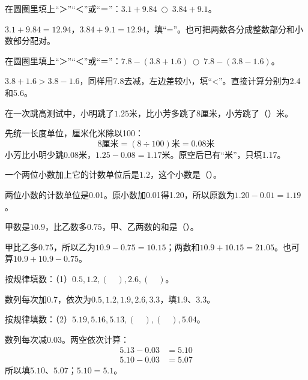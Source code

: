 在圆圈里填上“＞”“＜”或“＝”：\(3.1+9.84\ \bigcirc\ 3.84+9.1\)。\par
\begin{BookAnswer}
\(3.1+9.84=12.94\)，\allowbreak{}\(3.84+9.1=12.94\)，填“=”。也可把两数各分成整数部分和小数部分配对。
\end{BookAnswer}

在圆圈里填上“＞”“＜”或“＝”：\(7.8-(3.8+1.6)\ \bigcirc\ 7.8-(3.8-1.6)\)。\par
\begin{BookAnswer}
\(3.8+1.6>3.8-1.6\)，同样用7.8去减，左边差较小，填“<”。直接计算分别为2.4和5.6。
\end{BookAnswer}

在一次跳高测试中，小明跳了\(1.25\)米，比小芳多跳了8厘米，小芳跳了（\hspace{1.8em}）米。\par
\begin{BookAnswer}
先统一长度单位，厘米化米除以100：\[8\text{厘米}=(8\div100)\text{米}=0.08\text{米}\]小芳比小明少跳0.08米，\allowbreak{}\(1.25-0.08=1.17\)米。原空后已有“米”，只填1.17。
\end{BookAnswer}

一个两位小数加上它的计数单位后是\(1.2\)，这个小数是（\hspace{1.8em}）。\par
\begin{BookAnswer}
两位小数的计数单位是0.01。原小数加0.01得1.20，所以原数为\(1.20-0.01=1.19\)。
\end{BookAnswer}

甲数是\(10.9\)，比乙数多\(0.75\)，甲、乙两数的和是（\hspace{1.8em}）。\par
\begin{BookAnswer}
甲比乙多0.75，所以乙为\(10.9-0.75=10.15\)；两数和\(10.9+10.15=21.05\)。也可算\(10.9+10.9-0.75\)。
\end{BookAnswer}

按规律填数：（1）\(0.5,1.2,(\quad),2.6,(\quad)\)。\par
\begin{BookAnswer}
数列每次加0.7，依次为\(0.5,1.2,1.9,2.6,3.3\)，填1.9、3.3。
\end{BookAnswer}

按规律填数：（2）\(5.19,5.16,5.13,(\quad),(\quad),5.04\)。\par
\begin{BookAnswer}
数列每次减\(0.03\)。两空依次计算：\[\begin{aligned}5.13-0.03&=5.10\\5.10-0.03&=5.07\end{aligned}\]所以填\(5.10\)、\(5.07\)；\allowbreak{}\(5.10=5.1\)。
\end{BookAnswer}

